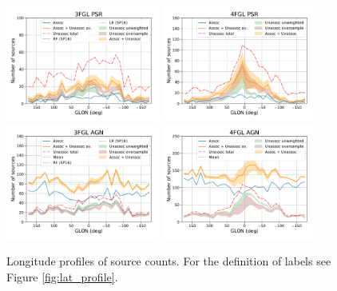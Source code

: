 


\begin{figure}[h]
\center
\includegraphics[width=0.45\textwidth]{plots/lon_profile_PSR_3FGL_oversample.pdf}
\includegraphics[width=0.45\textwidth]{plots/lon_profile_PSR_4FGL_oversample.pdf} \\
\includegraphics[width=0.45\textwidth]{plots/lon_profile_AGN_3FGL_oversample.pdf}
\includegraphics[width=0.45\textwidth]{plots/lon_profile_AGN_4FGL_oversample.pdf}
\caption{Longitude profiles of source counts. For the definition of labels see Figure \ref{fig:lat_profile}.}  
\label{fig:lon_profile}
\end{figure}


